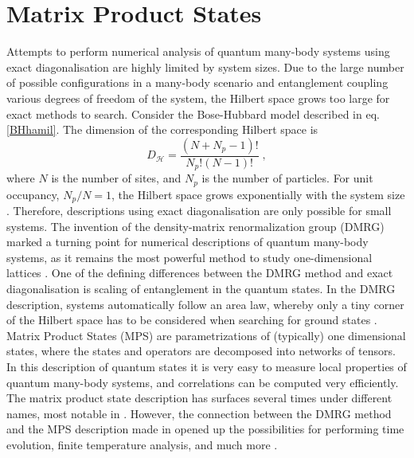\chapter{Matrix Product States}
Attempts to perform numerical analysis of quantum many-body systems using exact diagonalisation are highly limited by system sizes. Due to the large number of possible configurations in a many-body scenario and entanglement coupling various degrees of freedom of the system, the Hilbert space grows too large for exact methods to search.
Consider the Bose-Hubbard model described in eq. \eqref{BHhamil}. The dimension of the corresponding Hilbert space is
\begin{equation}
	D_{\mathcal{H}} = \frac{(N+N_p -1)!}{N_p ! (N-1)!} \; ,
\end{equation}
where $N$ is the number of sites, and $N_p$ is the number of particles. For unit occupancy, $N_p / N = 1$, the Hilbert space grows exponentially with the system size \cite{Dong}. Therefore, descriptions using exact diagonalisation are only possible for small systems.
The invention of the density-matrix renormalization group
(DMRG) marked a turning point for numerical descriptions of quantum many-body systems, as it remains the most powerful method to study one-dimensional lattices \cite{White1992,White1993}. One of the defining differences between the DMRG method and exact diagonalisation is scaling of entanglement in the quantum states. In the DMRG description, systems automatically follow an area law, whereby only a tiny corner of the Hilbert space has to be considered when searching for ground states \cite{Cramer}.\\
Matrix Product States (MPS) are parametrizations of (typically) one dimensional states, where the states and operators are decomposed into networks of tensors. In this description of quantum states it is very easy to measure local properties of quantum many-body systems, and correlations can be computed very efficiently. The matrix product state description has surfaces several times under different names, most notable in \cite{Baxter1968}. However, the connection between the DMRG method and the MPS description made in \cite{Ostlund1995, Dukelsky1998} opened up the possibilities for performing time evolution, finite temperature analysis, and much more \cite{schollwock}.


